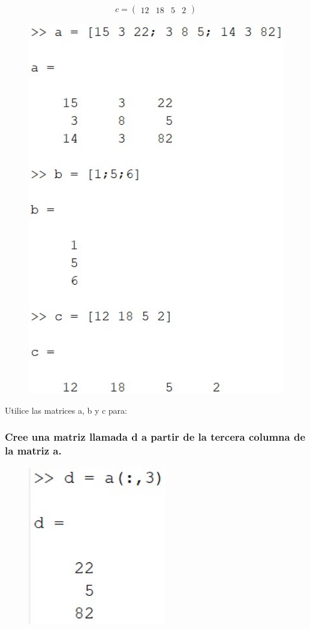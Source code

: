 \documentclass{article}
\begin{document}
\begin{equation*}
c =
\begin{pmatrix}
12 & 18 & 5 & 2
\end{pmatrix}
\end{equation*}

\begin{figure}[H]
    \centering
    \includegraphics[width = 12cm]{img7.jpg}
\end{figure}
\newpage
Utilice las matrices a, b y c para:

\subsubsection{Cree una matriz llamada d a partir de la tercera columna de la matriz a.}
\begin{figure}[H]
    \centering
    \includegraphics[width = 6cm]{img7a.jpg}
\end{figure}
\end{document}
